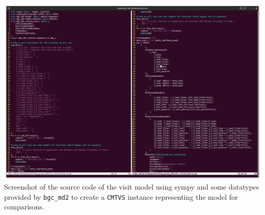 \documentclass[36pt]{article}
\begin{document}
\begin{tcbposter}
{  %
  \includegraphics[width=\columnwidth]{source.py.png}
    Screenshot of the source code of the visit model using sympy and some datatypes provided by \texttt{bgc\_md2}
    to create a \texttt{CMTVS}  instance representing the model for comparisons.
     

}
\end{tcbposter}
\end{document}
